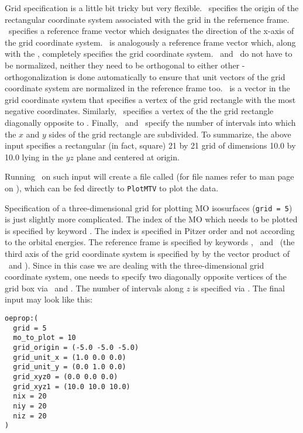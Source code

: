 Grid specification is a little bit tricky but very
flexible. \ specifies the origin of the
rectangular coordinate system associated with the grid in the
refernence frame. \ specifies a reference frame
vector which designates the direction of the x-axis of the grid
coordinate system.  \ is analogously a
reference frame vector which, along with the ,
completely specifies the grid coordinate system.
\ and \ do not have to
be normalized, neither they need to be orthogonal to either other -
orthogonalization is done automatically to ensure that unit vectors of
the grid coordinate system are normalized in the reference frame too.
\ is a vector in the grid coordinate system that
specifies a vertex of the grid rectangle with the most negative
coordinates. Similarly, \ specifies a vertex of the
the grid rectangle diagonally opposite to .
Finally, \ and \ specify the number of
intervals into which the $x$ and $y$ sides of the grid rectangle are
subdivided.  To summarize, the above input specifies a rectangular (in
fact, square) 21 by 21 grid of dimensions 10.0 by 10.0 lying in the
$yz$ plane and centered at origin.

Running \PSIoeprop\ on such input will create a file called
 (for file names refer to man page on \PSIoeprop),
which can be fed directly to {\tt PlotMTV} to plot the data.

Specification of a three-dimensional grid for plotting MO isosurfaces
({\tt grid = 5}) is just slightly more complicated. The index of the
MO which needs to be plotted is specified by keyword
.  The index is specified in Pitzer order and
not according to the orbital energies.  The reference frame is
specified by keywords , \
and \ (the third axis of the grid coordinate
system is specified by by the vector product of
\ and ).  Since in this
case we are dealing with the three-dimensional grid coordinate system,
one needs to specify two diagonally opposite vertices of the grid box
via \keyword{grid\_xyz0}\ and \keyword{grid\_xyz1}.  The number of
intervals along $z$ is specified via \keyword{niz}.  The final input
may look like this:
\begin{verbatim}
oeprop:(
  grid = 5
  mo_to_plot = 10
  grid_origin = (-5.0 -5.0 -5.0)
  grid_unit_x = (1.0 0.0 0.0)
  grid_unit_y = (0.0 1.0 0.0)
  grid_xyz0 = (0.0 0.0 0.0)
  grid_xyz1 = (10.0 10.0 10.0)
  nix = 20
  niy = 20
  niz = 20
)
\end{verbatim}

